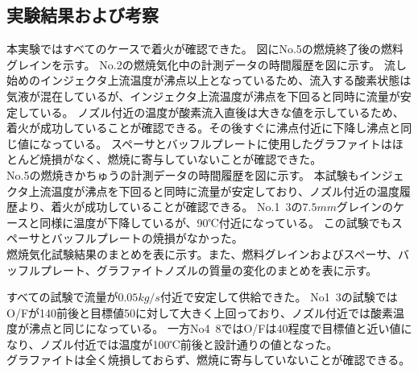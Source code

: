 \subsection{実験結果および考察}
本実験ではすべてのケースで着火が確認できた。
図にNo.5の燃焼終了後の燃料グレインを示す。
No.2の燃焼気化中の計測データの時間履歴を図に示す。
流し始めのインジェクタ上流温度が沸点以上となっているため、流入する酸素状態は気液が混在しているが、インジェクタ上流温度が沸点を下回ると同時に流量が安定している。
ノズル付近の温度が酸素流入直後は大きな値を示しているため、着火が成功していることが確認できる。その後すぐに沸点付近に下降し沸点と同じ値になっている。
スペーサとバッフルプレートに使用したグラファイトはほとんど焼損がなく、燃焼に寄与していないことが確認できた。
\\
No.5の燃焼きかちゅうの計測データの時間履歴を図に示す。
本試験もインジェクタ上流温度が沸点を下回ると同時に流量が安定しており、ノズル付近の温度履歴より、着火が成功していることが確認できる。
No.1~3の$7.5mm$グレインのケースと同様に温度が下降しているが、90℃付近になっている。
この試験でもスペーサとバッフルプレートの焼損がなかった。
\\
燃焼気化試験結果のまとめを表に示す。また、燃料グレインおよびスペーサ、バッフルプレート、グラファイトノズルの質量の変化のまとめを表に示す。

すべての試験で流量が$0.05kg/s$付近で安定して供給できた。
No1~3の試験ではO/Fが140前後と目標値50に対して大きく上回っており、ノズル付近では酸素温度が沸点と同じになっている。
一方No4~8ではO/Fは40程度で目標値と近い値になり、ノズル付近では温度が100℃前後と設計通りの値となった。
\\
グラファイトは全く焼損しておらず、燃焼に寄与していないことが確認できる。

